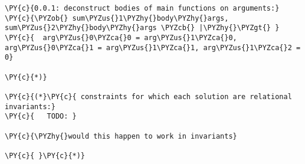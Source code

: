 \begin{Verbatim}[commandchars=\\\{\},codes={\catcode`\$=3\catcode`\^=7\catcode`\_=8}]
\PY{c}{0.0.1: deconstruct bodies of main functions on arguments:}
\PY{c}{\PYZob{} sum\PYZus{}1\PYZhy{}body\PYZhy{}args, sum\PYZus{}2\PYZhy{}body\PYZhy{}args \PYZcb{} |\PYZhy{}\PYZgt{} }
\PY{c}{  arg\PYZus{}0\PYZca{}0 = arg\PYZus{}1\PYZca{}0, arg\PYZus{}0\PYZca{}1 = arg\PYZus{}1\PYZca{}1, arg\PYZus{}1\PYZca{}2 = 0}

\PY{c}{*)}

\PY{c}{(*}\PY{c}{ constraints for which each solution are relational invariants:}
\PY{c}{   TODO: }

\PY{c}{\PYZhy{}would this happen to work in invariants}

\PY{c}{ }\PY{c}{*)}
\end{Verbatim}
